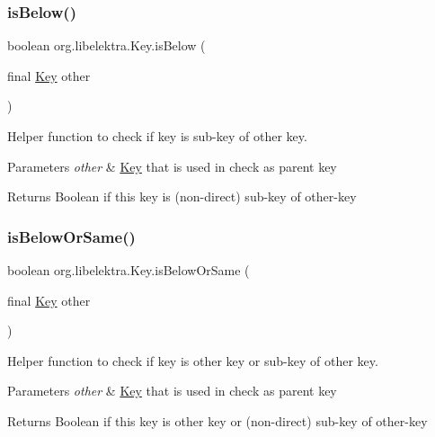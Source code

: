 \subsubsection{\texorpdfstring{is\+Below()}{isBelow()}}
{\footnotesize\ttfamily boolean org.\+libelektra.\+Key.\+is\+Below (\begin{DoxyParamCaption}\item[{final \hyperlink{classorg_1_1libelektra_1_1Key}{Key}}]{other }\end{DoxyParamCaption})\hspace{0.3cm}{\ttfamily [inline]}}



Helper function to check if key is sub-\/key of other key. 


\begin{DoxyParams}{Parameters}
{\em other} & \hyperlink{classorg_1_1libelektra_1_1Key}{Key} that is used in check as parent key \\
\hline
\end{DoxyParams}
\begin{DoxyReturn}{Returns}
Boolean if this key is (non-\/direct) sub-\/key of other-\/key 
\end{DoxyReturn}
\mbox{\label{classorg_1_1libelektra_1_1Key_ab3143b14824a384ec4b6f9005f6da554}} 
\subsubsection{\texorpdfstring{is\+Below\+Or\+Same()}{isBelowOrSame()}}
{\footnotesize\ttfamily boolean org.\+libelektra.\+Key.\+is\+Below\+Or\+Same (\begin{DoxyParamCaption}\item[{final \hyperlink{classorg_1_1libelektra_1_1Key}{Key}}]{other }\end{DoxyParamCaption})\hspace{0.3cm}{\ttfamily [inline]}}



Helper function to check if key is other key or sub-\/key of other key. 


\begin{DoxyParams}{Parameters}
{\em other} & \hyperlink{classorg_1_1libelektra_1_1Key}{Key} that is used in check as parent key \\
\hline
\end{DoxyParams}
\begin{DoxyReturn}{Returns}
Boolean if this key is other key or (non-\/direct) sub-\/key of other-\/key 
\end{DoxyReturn}
\mbox{\label{classorg_1_1libelektra_1_1Key_a2323fd06287eac6343ed60756f3cc9c1}} 
